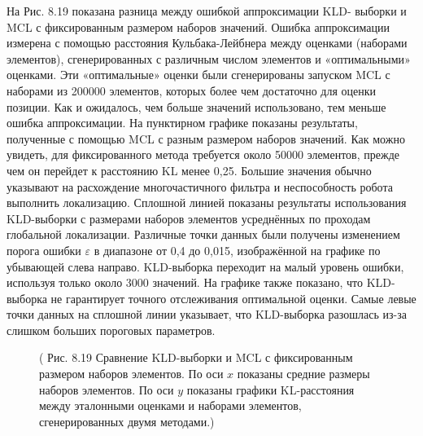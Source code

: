 \documentclass[10pt,a4paper]{article}
\begin{document}
На Рис. 8.19 показана разница между ошибкой аппроксимации KLD- выборки и MCL с фиксированным размером наборов значений. Ошибка аппроксимации измерена с помощью расстояния Кульбака-Лейбнера между оценками (наборами элементов), сгенерированных с различным числом элементов и «оптимальными» оценками. Эти «оптимальные» оценки были сгенерированы запуском MCL с наборами из 200000 элементов, которых более чем достаточно для оценки позиции. Как и ожидалось, чем больше значений использовано, тем меньше ошибка аппроксимации. На пунктирном графике показаны результаты, полученные с помощью MCL с разным размером наборов значений. Как можно увидеть, для фиксированного метода требуется около 50000 элементов, прежде чем он перейдет к расстоянию KL менее 0,25. Большие значения обычно указывают на расхождение многочастичного фильтра и неспособность робота выполнить локализацию. Сплошной линией показаны результаты использования KLD-выборки с размерами наборов элементов усреднённых по проходам глобальной локализации. Различные точки данных были получены изменением порога ошибки $\varepsilon$ в диапазоне от 0,4 до 0,015, изображённой на графике по убывающей слева направо. KLD-выборка переходит на малый уровень ошибки, используя только около 3000 значений. На графике также показано, что KLD-выборка не гарантирует точного отслеживания оптимальной оценки. Самые левые точки данных на сплошной линии указывает, что KLD-выборка разошлась из-за слишком больших пороговых параметров.

\begin{figure}[H]
	\caption{ ( Рис. 8.19 Сравнение KLD-выборки и MCL с фиксированным размером наборов элементов.  По оси $x$ показаны средние размеры наборов элементов. По оси $y$ показаны графики KL-расстояния между эталонными оценками и наборами элементов, сгенерированных двумя методами.)}
	\label{fig:819orig}
\end{figure}
\end{document}
